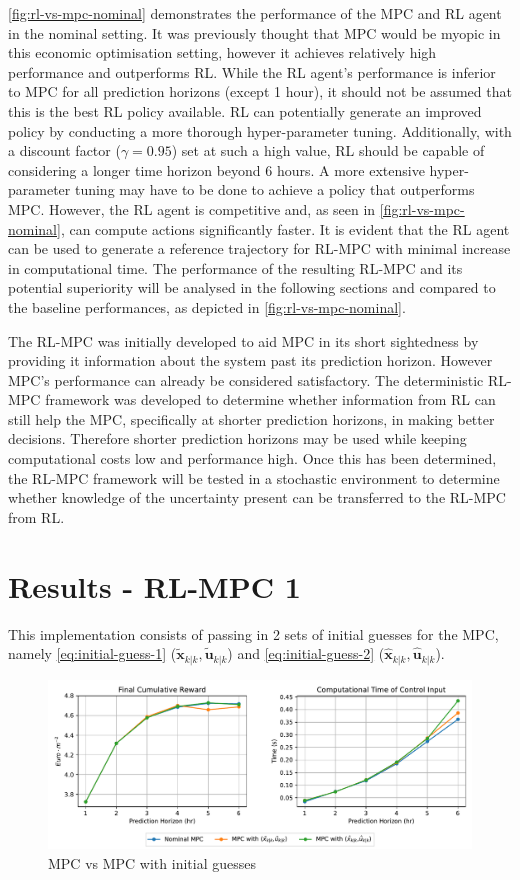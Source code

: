 \autoref{fig:rl-vs-mpc-nominal} demonstrates the performance of the MPC and RL agent in the nominal setting. It was previously thought that MPC would be myopic in this economic optimisation setting, however it achieves relatively high performance and outperforms RL. While the RL agent's performance is inferior to MPC for all prediction horizons (except 1 hour), it should not be assumed that this is the best RL policy available.  RL can potentially generate an improved policy by conducting a more thorough hyper-parameter tuning. Additionally, with a discount factor ($\gamma = 0.95$) set at such a high value, RL should be capable of considering a longer time horizon beyond 6 hours. A more extensive hyper-parameter tuning may have to be done to achieve a policy that outperforms MPC. However, the RL agent is competitive and, as seen in \autoref{fig:rl-vs-mpc-nominal}, can compute actions significantly faster. It is evident that the RL agent can be used to generate a reference trajectory for RL-MPC with minimal increase in computational time. The performance of the resulting RL-MPC and its potential superiority will be analysed in the following sections and compared to the baseline performances, as depicted in \autoref{fig:rl-vs-mpc-nominal}. 

The RL-MPC was initially developed to aid MPC in its short sightedness by providing it information about the system past its prediction horizon. However MPC's performance can already be considered satisfactory. The deterministic RL-MPC framework was developed to determine whether information from RL can still help the MPC, specifically at shorter prediction horizons, in making better decisions. Therefore shorter prediction horizons may be used while keeping computational costs low and performance high. Once this has been determined, the RL-MPC framework will be tested in a stochastic environment to determine whether knowledge of the uncertainty present can be transferred to the RL-MPC from RL.

\section{Results - RL-MPC 1}
This implementation consists of passing in 2 sets of initial guesses for the MPC, namely \autoref{eq:initial-guess-1} ($\tilde{\mathbf{x}}_{k|k},\tilde{\mathbf{u}}_{k|k}$) and \autoref{eq:initial-guess-2} ($\hat{\mathbf{x}}_{k|k},\hat{\mathbf{u}}_{k|k}$).
\begin{figure}[H]
	\centering
	\includegraphics[width=\textwidth]{figures/rl_mpc_impl_1.pdf}
	\caption{MPC vs MPC with initial guesses}
	\label{fig:rlmpc-impl1}
\end{figure}

